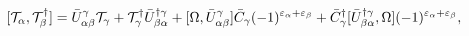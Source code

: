 \begin{equation}\label{5.16}
[{\cal T}_\alpha,{\cal T}^\dagger_\beta]=
\bar{U}^\gamma_{\alpha\beta}{\cal T}_\gamma +
{\cal T}^\dagger_\gamma\bar{U}^{\dagger\gamma}_{\beta\alpha}+
[\Omega,\bar{U}^\gamma_{\alpha\beta}]\bar{C}_\gamma
(-1)^{\varepsilon_\alpha+\varepsilon_\beta}+
\bar{C}^\dagger_\gamma[\bar{U}^{\dagger\gamma}_{\beta\alpha},\Omega]
(-1)^{\varepsilon_\alpha+\varepsilon_\beta},
\end{equation}

